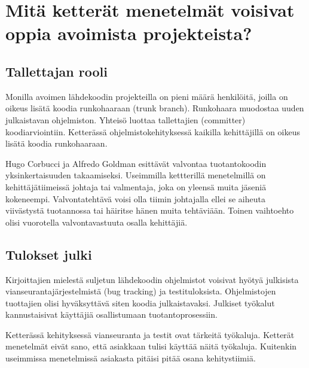 \documentclass[finnish]{tktltiki2}
\theoremstyle{definition}
\theoremstyle{remark}
\begin{document}
\section{Mitä ketterät menetelmät voisivat oppia avoimista projekteista?}

\subsection{Tallettajan rooli}

Monilla avoimen lähdekoodin projekteilla on pieni määrä henkilöitä, joilla on oikeus lisätä koodia runkohaaraan (trunk branch). Runkohaara muodostaa uuden julkaistavan ohjelmiston. Yhteisö luottaa tallettajien (committer) koodiarviointiin. Ketterässä ohjelmistokehityksessä kaikilla kehittäjillä on oikeus lisätä koodia runkohaaraan.

Hugo Corbucci ja Alfredo Goldman esittävät valvontaa tuotantokoodin yksinkertaisuuden takaamiseksi. Useimmilla kettterillä menetelmillä on kehittäjätiimeissä johtaja tai valmentaja, joka on yleensä muita jäseniä kokeneempi. Valvontatehtävä voisi olla tiimin johtajalla ellei se aiheuta viivästystä tuotannossa tai häiritse hänen muita tehtäviään. Toinen vaihtoehto olisi vuorotella valvontavastuuta osalla kehittäjiä.

\subsection{Tulokset julki}

Kirjoittajien mielestä suljetun lähdekoodin ohjelmistot voisivat hyötyä julkisista vianseurantajärjestelmistä (bug tracking) ja testituloksista. Ohjelmistojen tuottajien olisi hyväksyttävä siten koodia julkaistavaksi. Julkiset työkalut kannustaisivat käyttäjiä osallistumaan tuotantoprosessiin.

Ketterässä kehityksessä vianseuranta ja testit ovat tärkeitä työkaluja. Ketterät menetelmät  eivät sano, että asiakkaan tulisi käyttää näitä työkaluja. Kuitenkin useimmissa menetelmissä asiakasta pitäisi pitää osana kehitystiimiä.

%
%
% 
%



\end{document}
